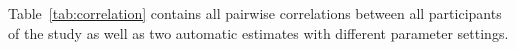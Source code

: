 \documentclass{llncs}
\begin{document}

Table~\ref{tab:correlation} contains all pairwise correlations between all
participants of the study as well as two automatic estimates with different
parameter settings.
\end{document}
